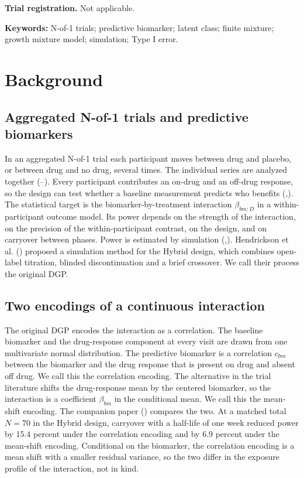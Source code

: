 \documentclass[
  11pt,
]{article}
\begin{document}
\textbf{Trial registration.} Not applicable.

\textbf{Keywords:} N-of-1 trials; predictive biomarker; latent class;
finite mixture; growth mixture model; simulation; Type I error.

\section{Background}\label{background}

\subsection{Aggregated N-of-1 trials and predictive biomarkers}\label{aggregated-n-of-1-trials-and-predictive-biomarkers}

In an aggregated N-of-1 trial each participant moves between drug and
placebo, or between drug and no drug, several times. The individual
series are analyzed together (--). Every participant contributes an on-drug
and an off-drug response, so the design can test whether a baseline
measurement predicts who benefits (,). The
statistical target is the biomarker-by-treatment interaction
\(\beta_{bm:D}\) in a within-participant outcome model. Its power
depends on the strength of the interaction, on the precision of the
within-participant contrast, on the design, and on carryover between
phases. Power is estimated by simulation (,). Hendrickson et al. () proposed a
simulation method for the Hybrid design, which combines open-label
titration, blinded discontinuation and a brief crossover. We call
their process the original DGP.

\subsection{Two encodings of a continuous interaction}\label{two-encodings-of-a-continuous-interaction}

The original DGP encodes the interaction as a correlation. The
baseline biomarker and the drug-response component at every visit are
drawn from one multivariate normal distribution. The predictive
biomarker is a correlation \(c_{bm}\) between the biomarker and the drug
response that is present on drug and absent off drug. We call this
the correlation encoding. The alternative in the trial literature
shifts the drug-response mean by the centered biomarker, so the
interaction is a coefficient \(\beta_{bm}\) in the conditional mean. We
call this the mean-shift encoding. The companion paper
() compares the two. At a matched total
\(N = 70\) in the Hybrid design, carryover with a half-life of one week
reduced power by 15.4 percent under the correlation encoding and by
6.9 percent under the mean-shift encoding. Conditional on the
biomarker, the correlation encoding is a mean shift with a smaller
residual variance, so the two differ in the exposure profile of the
interaction, not in kind.
\end{document}
